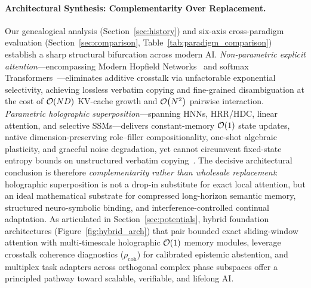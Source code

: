\paragraph{Architectural Synthesis: Complementarity Over Replacement.}
Our genealogical analysis (Section~\ref{sec:history}) and six-axis cross-paradigm evaluation (Section~\ref{sec:comparison}, Table~\ref{tab:paradigm_comparison}) establish a sharp structural bifurcation across modern AI.
\emph{Non-parametric explicit attention}---encompassing Modern Hopfield Networks~\cite{RAMSAUER_MODERN_HOPFIELD} and softmax Transformers~\cite{VASWANI_TRANSFORMER}---eliminates additive crosstalk via unfactorable exponential selectivity, achieving lossless verbatim copying and fine-grained disambiguation at the cost of $\mathcal{O}\!\left(ND\right)$ KV-cache growth and $\mathcal{O}\!\left(N^2\right)$ pairwise interaction.
\emph{Parametric holographic superposition}---spanning HNNs, HRR/HDC, linear attention, and selective SSMs---delivers constant-memory $\mathcal{O}\!\left(1\right)$ state updates, native dimension-preserving role--filler compositionality, one-shot algebraic plasticity, and graceful noise degradation, yet cannot circumvent fixed-state entropy bounds on unstructured verbatim copying~\cite{JELASSI_2024_REPEAT_AFTER_ME,ARORA_2023_ZOOLOGY}.
The decisive architectural conclusion is therefore \emph{complementarity rather than wholesale replacement}: holographic superposition is not a drop-in substitute for exact local attention, but an ideal mathematical substrate for compressed long-horizon semantic memory, structured neuro-symbolic binding, and interference-controlled continual adaptation.
As articulated in Section~\ref{sec:potentials}, hybrid foundation architectures (Figure~\ref{fig:hybrid_arch}) that pair bounded exact sliding-window attention with multi-timescale holographic $\mathcal{O}\!\left(1\right)$ memory modules, leverage crosstalk coherence diagnostics ($\rho_{\mathrm{coh}}$) for calibrated epistemic abstention, and multiplex task adapters across orthogonal complex phase subspaces offer a principled pathway toward scalable, verifiable, and lifelong AI.

